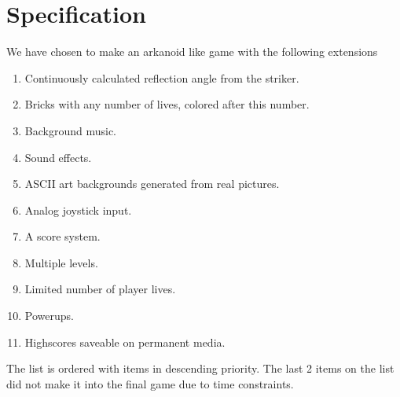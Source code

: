 \section{Specification}
We have chosen to make an arkanoid like game with the following extensions

\begin{enumerate}
\item Continuously calculated reflection angle from the striker.
\item Bricks with any number of lives, colored after this number.
\item Background music.
\item Sound effects.
\item ASCII art backgrounds generated from real pictures.
\item Analog joystick input.
\item A score system.
\item Multiple levels.
\item Limited number of player lives.
\item Powerups.
\item Highscores saveable on permanent media.
\end{enumerate}

The list is ordered with items in descending priority. The last 2 items on the list
did not make it into the final game due to time constraints.
